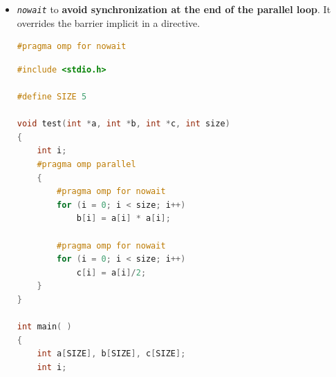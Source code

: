 \begin{itemize}
\begin{examplebox}
\begin{lstlisting}[language=C++]
    printf_s("------------------------------------------------\n");
}\end{lstlisting}
    The result will be:
\begin{lstlisting}
------------------------------------------------
| static | static | dynamic | dynamic | guided |
|    1   |    5   |    1    |    5    |        |
------------------------------------------------
|    0   |    0   |    0    |    2    |    1   |
|    1   |    0   |    3    |    2    |    1   |
|    2   |    0   |    3    |    2    |    1   |
|    3   |    0   |    3    |    2    |    1   |
|    0   |    0   |    2    |    2    |    1   |
|    1   |    1   |    2    |    3    |    3   |
|    2   |    1   |    2    |    3    |    3   |
|    3   |    1   |    0    |    3    |    3   |
|    0   |    1   |    0    |    3    |    3   |
|    1   |    1   |    0    |    3    |    2   |
|    2   |    2   |    1    |    0    |    2   |
|    3   |    2   |    1    |    0    |    2   |
|    0   |    2   |    1    |    0    |    3   |
|    1   |    2   |    2    |    0    |    3   |
|    2   |    2   |    2    |    0    |    0   |
|    3   |    3   |    2    |    1    |    0   |
|    0   |    3   |    3    |    1    |    1   |
|    1   |    3   |    3    |    1    |    1   |
|    2   |    3   |    3    |    1    |    1   |
|    3   |    3   |    0    |    1    |    3   |
------------------------------------------------\end{lstlisting}
    \end{examplebox}

    \item \texttt{\emph{nowait}} to \textbf{avoid synchronization at the end of the parallel loop}. It overrides the barrier implicit in a directive.
    \begin{lstlisting}[language=C++]
#pragma omp for nowait\end{lstlisting}
    \begin{examplebox}
\begin{lstlisting}[language=C++]
#include <stdio.h>

#define SIZE 5

void test(int *a, int *b, int *c, int size)
{
    int i;
    #pragma omp parallel
    {
        #pragma omp for nowait
        for (i = 0; i < size; i++)
            b[i] = a[i] * a[i];

        #pragma omp for nowait
        for (i = 0; i < size; i++)
            c[i] = a[i]/2;
    }
}

int main( )
{
    int a[SIZE], b[SIZE], c[SIZE];
    int i;


\end{lstlisting}
\end{examplebox}
\end{itemize}
